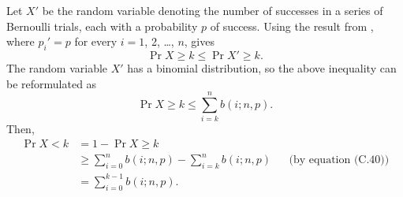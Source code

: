 \starred
Let $X'$ be the random variable denoting the number of successes in a series of Bernoulli trials, each with a probability $p$ of success.
Using the result from , where $p_i'=p$ for every $i=1$, 2, \dots, $n$, gives
\[
    \Pr{X\ge k} \le \Pr{X'\ge k}.
\]
The random variable $X'$ has a binomial distribution, so the above inequality can be reformulated as
\[
    \Pr{X\ge k} \le \sum_{i=k}^nb(i;n,p).
\]
Then,
\begin{align*}
    \Pr{X<k} &= 1-\Pr{X\ge k} \\
    &\ge \sum_{i=0}^nb(i;n,p)-\sum_{i=k}^nb(i;n,p) && \text{(by equation (C.40))} \\
    &= \sum_{i=0}^{k-1}b(i;n,p).
\end{align*}
